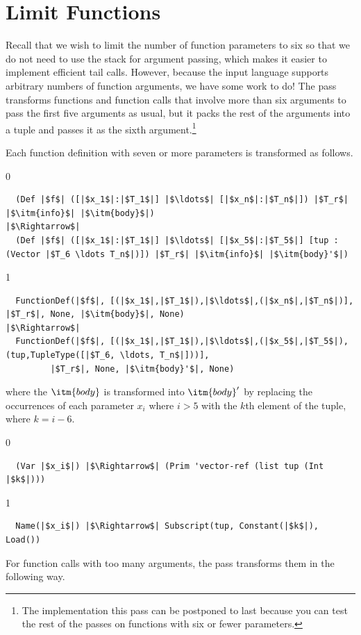 \documentclass[7x10]{TimesAPriori_MIT}%
\def\racketEd{0}
\def\pythonEd{1}
\def\edition{0}
\numberwithin{theorem}{chapter}
\numberwithin{definition}{chapter}
\numberwithin{equation}{chapter}
\begin{document}
\section{Limit Functions}
\label{sec:limit-functions-r4}

Recall that we wish to limit the number of function parameters to six
so that we do not need to use the stack for argument passing, which
makes it easier to implement efficient tail calls.  However, because
the input language \LangFun{} supports arbitrary numbers of function
arguments, we have some work to do! The  pass
transforms functions and function calls that involve more than six
arguments to pass the first five arguments as usual, but it packs the
rest of the arguments into a tuple and passes it as the sixth
argument.\footnote{The implementation this pass can be postponed to
  last because you can test the rest of the passes on functions with
  six or fewer parameters.}

Each function definition with seven or more parameters is transformed as
follows.
{\if\edition\racketEd   
\begin{lstlisting}
  (Def |$f$| ([|$x_1$|:|$T_1$|] |$\ldots$| [|$x_n$|:|$T_n$|]) |$T_r$| |$\itm{info}$| |$\itm{body}$|) 
|$\Rightarrow$|
  (Def |$f$| ([|$x_1$|:|$T_1$|] |$\ldots$| [|$x_5$|:|$T_5$|] [tup : (Vector |$T_6 \ldots T_n$|)]) |$T_r$| |$\itm{info}$| |$\itm{body}'$|) 
\end{lstlisting}
\fi}
{\if\edition\pythonEd   
\begin{lstlisting}
  FunctionDef(|$f$|, [(|$x_1$|,|$T_1$|),|$\ldots$|,(|$x_n$|,|$T_n$|)], |$T_r$|, None, |$\itm{body}$|, None)
|$\Rightarrow$|
  FunctionDef(|$f$|, [(|$x_1$|,|$T_1$|),|$\ldots$|,(|$x_5$|,|$T_5$|),(tup,TupleType([|$T_6, \ldots, T_n$|]))],
         |$T_r$|, None, |$\itm{body}'$|, None)
\end{lstlisting}
\fi}
%
\noindent where the $\itm{body}$ is transformed into $\itm{body}'$ by
replacing the occurrences of each parameter $x_i$ where $i > 5$ with
the $k$th element of the tuple, where $k = i - 6$.
%
{\if\edition\racketEd
\begin{lstlisting}
  (Var |$x_i$|) |$\Rightarrow$| (Prim 'vector-ref (list tup (Int |$k$|)))
\end{lstlisting}
\fi}
{\if\edition\pythonEd   
\begin{lstlisting}
  Name(|$x_i$|) |$\Rightarrow$| Subscript(tup, Constant(|$k$|), Load())
\end{lstlisting}
\fi}

For function calls with too many arguments, the 
pass transforms them in the following way.
\end{document}

